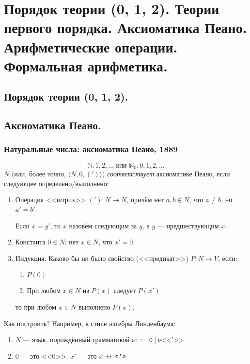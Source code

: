 \documentclass[10pt,a4paper,oneside]{article}
\newcommand\doubleplus{+\kern-1.3ex+\kern0.8ex}
\begin{document}
\section{Порядок теории (0, 1, 2). Теории первого порядка. Аксиоматика Пеано. Арифметические операции. Формальная арифметика.}
\subsection{Порядок теории (0, 1, 2).}

\subsection{Аксиоматика Пеано.}
\subsubsection{Натуральные числа: аксиоматика Пеано, 1889}\vspace{-0.5cm}
 $$\mathbb{N}: 1, 2, \dots \mbox{ или } \mathbb{N}_0: 0, 1, 2, \dots$$\vspace{-1cm}
  $N$ (или, более точно, $\langle N, 0, (')\rangle$) \emph{соответствует} аксиоматике Пеано, 
  если следующее определено/выполнено:
  \begin{enumerate}
     \item Операция <<штрих>> $('): N \to N$, причём нет $a,b \in N$, что $a \ne b$, но $a' = b'$.
           
           Если $x = y'$, то $x$ назовём следующим за $y$, а $y$ --- предшествующим $x$.
     \item Константа $0 \in N$: нет $x \in N$, что $x' = 0$.
     \item Индукция. Каково бы ни было свойство (<<предикат>>) $P: N \to V$, если:
           \begin{enumerate}
           \item $P(0)$
           \item При любом $x\in N$ из $P(x)$ следует $P(x')$
           \end{enumerate}
           то при любом $x \in N$ выполнено $P(x)$.
  \end{enumerate}
Как построить? Например, в стиле алгебры Линденбаума:
\begin{enumerate}
\item $N$ --- язык, порождённый грамматикой $\nu ::= \texttt{0}\ |\ \nu \texttt{<<'>>}$
\item $0$ --- это $\text{<<0>>}$, $x'$ --- это $x \doubleplus \texttt{<<'>>}$
\end{enumerate}
\end{document}
